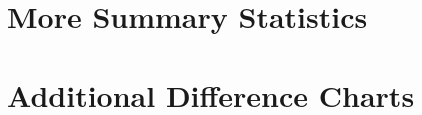 \documentclass[12pt,letterpaper]{article}
\begin{document}
\newpage
\appendix
{}  %
\FloatBarrier
\section{More Summary Statistics}



\begin{landscape}

\end{landscape}


\FloatBarrier
\newpage
\section{Additional Difference Charts}






\end{document}
